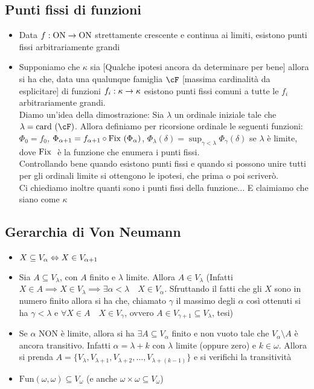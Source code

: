 \documentclass[a4paper,NoNotes,GeneralMath]{stdmdoc}
\newcommand{\card}[1]{\text{card }({#1})}
\newcommand{\ON}{\text{ON}}
\newcommand{\Fun}{\text{Fun}}
\begin{document}
	\subsection*{Punti fissi di funzioni}
	\begin{itemize}
		\item Data $f: \ON \rar \ON$ strettamente crescente e continua ai limiti, esistono punti fissi arbitrariamente grandi
		\item Supponiamo che $\kappa$ sia [Qualche ipotesi ancora da determinare per bene] allora si ha che, data una qualunque famiglia $\cF$ [massima cardinalità da esplicitare] di funzioni $f_i: \kappa \rightarrow \kappa$ esistono punti fissi comuni a tutte le $f_i$ arbitrariamente grandi. \\
			Diamo un'idea della dimostrazione: Sia $\lambda$ un ordinale iniziale tale che $\lambda = \card{\cF}$. Allora definiamo per ricorsione ordinale le seguenti funzioni: $\Phi_0 = f_0$, $\Phi_{\alpha + 1} = f_{\alpha + 1} \circ \mbox{Fix }(\Phi_\alpha)$, $\Phi_\lambda (\delta) = \sup_{\gamma < \lambda} \Phi_{\gamma}(\delta) $ se $\lambda$ è limite, dove $\mbox{Fix }$ è la funzione che enumera i punti fissi. \\
			Controllando bene quando esistono punti fissi e quando si possono unire tutti per gli ordinali limite si ottengono le ipotesi, che prima o poi scriverò. \\
			Ci chiediamo inoltre quanti sono i punti fissi della funzione... E claimiamo che siano come $\kappa$
	\end{itemize}
	
	\subsection*{Gerarchia di Von Neumann}
	\begin{itemize}
		\item $X \subseteq V_\alpha \Leftrightarrow X \in V_{\alpha + 1}$
		\item Sia $A \subseteq V_\lambda$, con $A$ finito e $\lambda$ limite. Allora $A \in V_\lambda$ (Infatti $X \in A \implies X \in V_\lambda \implies \exists \alpha < \lambda \quad X \in V_\alpha$. Sfruttando il fatti che gli $X$ sono in numero finito allora si ha che, chiamato $\gamma$ il massimo degli $\alpha$ così ottenuti si ha $\gamma < \lambda$ e $\forall X \in A \quad X \in V_\gamma$, ovvero $A \in V_{\gamma + 1} \subseteq V_\lambda$, tesi)
		\item Se $\alpha$ NON è limite, allora si ha $\exists A \subseteq V_{\alpha}$ finito e non vuoto tale che $V_\alpha \setminus A$ è ancora transitivo. Infatti $\alpha = \lambda + k$ con $\lambda$ limite (oppure zero) e $k \in \omega$. Allora si prenda $A = \{V_\lambda, V_{\lambda + 1}, V_{\lambda + 2}, \ldots, V_{\lambda + (k - 1)} \}$ e si verifichi la transitività
		\item $\Fun(\omega, \omega) \subseteq V_\omega$ (e anche $\omega \times \omega \subseteq V_\omega$)
	\end{itemize}
	
\end{document}

